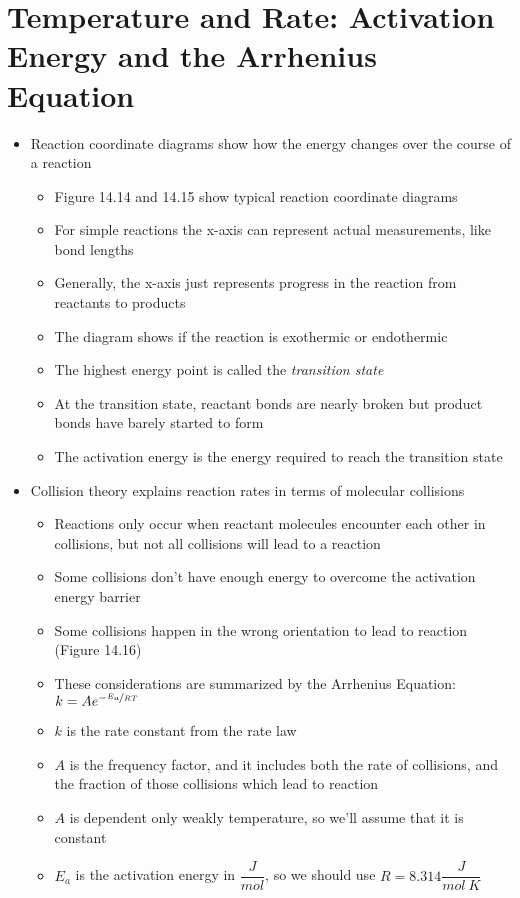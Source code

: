 \documentclass[12pt, openany, letterpaper]{memoir}
\begin{document}
\section{Temperature and Rate: Activation Energy and the Arrhenius Equation}
\begin{itemize}
	\item Reaction coordinate diagrams show how the energy changes over the course of a reaction
	\begin{itemize}
		\item Figure 14.14 and 14.15 show typical reaction coordinate diagrams
		\item For simple reactions the x-axis can represent actual measurements, like bond lengths
		\item Generally, the x-axis just represents progress in the reaction from reactants to products
		\item The diagram shows if the reaction is exothermic or endothermic
		\item The highest energy point is called the \emph{transition state}
		\item At the transition state, reactant bonds are nearly broken but product bonds have barely started to form
		\item The activation energy is the energy required to reach the transition state
	\end{itemize}
	\item Collision theory explains reaction rates in terms of molecular collisions
	\begin{itemize}
		\item Reactions only occur when reactant molecules encounter each other in collisions, but not all collisions will lead to a reaction
		\item Some collisions don't have enough energy to overcome the activation energy barrier
		\item Some collisions happen in the wrong orientation to lead to reaction (Figure 14.16)
		\item These considerations are summarized by the Arrhenius Equation: $k=Ae^{-\nicefrac{E_a}{RT}}$
		\item $k$ is the rate constant from the rate law
		\item $A$ is the frequency factor, and it includes both the rate of collisions, and the fraction of those collisions which lead to reaction
		\item $A$ is dependent only weakly temperature, so we'll assume that it is constant
		\item $E_a$ is the activation energy in $\dfrac{J}{mol}$, so we should use $R=8.314\dfrac{J}{mol~K}$

\end{itemize}
\end{itemize}
\end{document}
